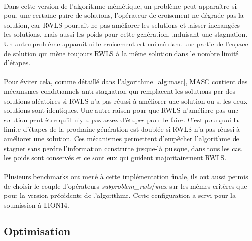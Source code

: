 \documentclass[a4paper,11pt,twoside,french,report]{../common/simplem}
\begin{document}
				\paragraph*{}
					Dans cette version de l'algorithme mémétique, un problème peut apparaître si, pour une certaine paire de solutions, l'opérateur de croisement ne dégrade pas la solution, car \gls{RWLS} pourrait ne pas améliorer les solutions et laisser inchangées les solutions, mais aussi les poids pour cette génération, induisant une stagnation. Un autre problème apparait si le croisement est coincé dans une partie de l'espace de solution qui mène toujours \gls{RWLS} à la même solution dans le nombre limité d'étapes.
				\paragraph*{}
					Pour éviter cela, comme détaillé dans l'algorithme~\ref{alg:masc}, \gls{MASC} contient des mécanismes conditionnels anti-stagnation qui remplacent les solutions par des solutions aléatoires si \gls{RWLS} n'a pas réussi à améliorer une solution ou si les deux solutions sont identiques. Une autre raison pour que \gls{RWLS} n'améliore pas une solution peut être qu'il n'y a pas assez d'étapes pour le faire. C'est pourquoi la limite d'étapes de la prochaine génération est doublée si \gls{RWLS} n'a pas réussi à améliorer une solution. Ces mécanismes permettent d'empêcher l'algorithme de stagner sans perdre l'information construite jusque-là puisque, dans tous les cas, les poids sont conservés et ce sont eux qui guident majoritairement \gls{RWLS}.
				\paragraph*{}
					
				\paragraph*{}
					Plusieurs benchmarks ont mené à cette implémentation finale, ils ont aussi permis de choisir le couple d'opérateurs \textit{subproblem\_rwls}/\textit{max} sur les mêmes critères que pour la version précédente de l'algorithme. Cette configuration a servi pour la soumission à \acrshort{LION14}.
			\subsection{Optimisation}
\end{document}
